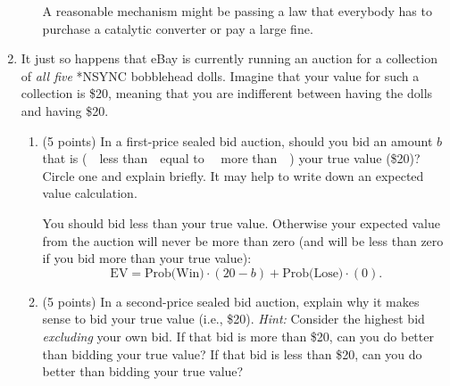 \documentclass[twoside]{article}
\newcommand{\mybigskip}{\vspace{1in}}
\begin{document}
\begin{enumerate}
\begin{enumerate}
\begin{EXAM} \clearpage \end{EXAM}


\begin{KEY}
A reasonable mechanism might be passing a law that everybody has to purchase a catalytic converter or pay a large fine.
\end{KEY}

    \end{enumerate}











\item It just so happens that eBay is currently running an auction for a collection of \emph{all five} *NSYNC bobblehead dolls. Imagine that your value for such a collection is \$20, meaning that you are indifferent between having the dolls and having \$20.

    \begin{enumerate}
    \item \begin{EXAM} (5 points) In a first-price sealed bid auction, should you bid an amount $b$ that is (\ \ less than\ \ equal to \ \ more than\ \ ) your true value (\$20)? Circle one and explain briefly. It may help to write down an expected value calculation.     \mybigskip\end{EXAM}

\begin{KEY}
You should bid less than your true value. Otherwise your expected value from the auction will never be more than zero (and will be less than zero if you bid more than your true value):
\[
\mbox{EV}=\mbox{Prob(Win)}\cdot (20-b) + \mbox{Prob(Lose)}\cdot (0).
\]
\end{KEY}



    \item \begin{EXAM} (5 points) In a second-price sealed bid auction, explain why it makes sense to bid your true value (i.e., \$20). %
\emph{Hint: }Consider the highest bid \emph{excluding} your own bid. If that bid is more than \$20, can you do better than bidding your true value? If that bid is less than \$20, can you do better than bidding your true value? \vspace{2.3in}\end{EXAM}


\end{enumerate}
\end{enumerate}
\end{document}
